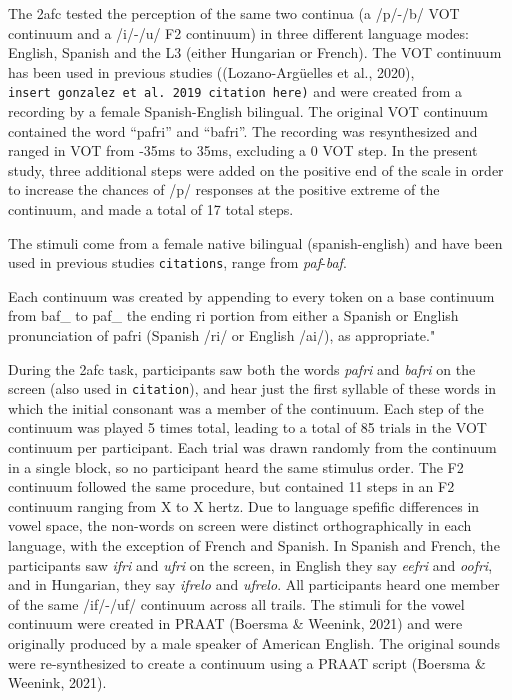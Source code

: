 \documentclass[
  english,
  man]{apa6}
\begin{document}
The 2afc tested the perception of the same two continua (a /p/-/b/ VOT continuum and a /i/-/u/ F2 continuum) in three different language modes: English, Spanish and the L3 (either Hungarian or French). The VOT continuum has been used in previous studies ((Lozano-Argüelles et al., 2020), \texttt{insert\ gonzalez\ et\ al.\ 2019\ citation\ here)} and were created from a recording by a female Spanish-English bilingual. The original VOT continuum contained the word \enquote{pafri} and \enquote{bafri}. The recording was resynthesized and ranged in VOT from -35ms to 35ms, excluding a 0 VOT step. In the present study, three additional steps were added on the positive end of the scale in order to increase the chances of /p/ responses at the positive extreme of the continuum, and made a total of 17 total steps.

The stimuli come from a female native bilingual (spanish-english) and have been used in previous studies \texttt{citations}, range from \emph{paf}-\emph{baf}.

Each continuum was created
by appending to every token on a base continuum
from baf\_ to paf\_ the ending ri portion from either a
Spanish or English pronunciation of pafri (Spanish /ri/ or
English /ai/), as appropriate."

During the 2afc task, participants saw both the words \emph{pafri} and \emph{bafri} on the screen (also used in \texttt{citation}), and hear just the first syllable of these words in which the initial consonant was a member of the continuum.
Each step of the continuum was played 5 times total, leading to a total of 85 trials in the VOT continuum per participant. Each trial was drawn randomly from the continuum in a single block, so no participant heard the same stimulus order.
The F2 continuum followed the same procedure, but contained 11 steps in an F2 continuum ranging from X to X hertz.
Due to language spefific differences in vowel space, the non-words on screen were distinct orthographically in each language, with the exception of French and Spanish.
In Spanish and French, the participants saw \emph{ifri} and \emph{ufri} on the screen, in English they say \emph{eefri} and \emph{oofri}, and in Hungarian, they say \emph{ifrelo} and \emph{ufrelo}.
All participants heard one member of the same /if/-/uf/ continuum across all trails.
The stimuli for the vowel continuum were created in PRAAT (Boersma \& Weenink, 2021) and were originally produced by a male speaker of American English.
The original sounds were re-synthesized to create a continuum using a PRAAT script (Boersma \& Weenink, 2021).
\end{document}
